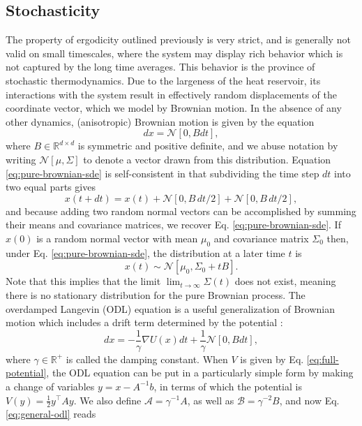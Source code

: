 \documentclass[prx,onecolumn,floatfix,longbibliography,notitlepage, nofootinbib,12pt]{revtex4-2}
\begin{document}
\begin{appendix}
\subsection{Stochasticity}
The property of ergodicity outlined previously is very strict, and is generally not valid on small timescales, where the system may display rich behavior which is not captured by the long time averages. This behavior is the province of stochastic thermodynamics. Due to the largeness of the heat reservoir, its interactions with the system result in effectively random displacements of the coordinate vector, which we model by Brownian motion. In the absence of any other dynamics, (anisotropic) Brownian motion is given by the equation \cite{doob1942brownian}
\begin{equation}
\label{eq:pure-brownian-sde}
    dx = \mathcal{N}[0, B dt],
\end{equation}
where $B\in \mathbb{R}^{d\times d}$ is symmetric and positive definite, and we abuse notation by writing $\mathcal{N}[\mu, \Sigma]$ to denote a vector drawn from this distribution. Equation \eqref{eq:pure-brownian-sde} is self-consistent in that subdividing the time step $dt$ into two equal parts gives
\begin{equation}
    x(t+dt) = x(t) + \mathcal{N}[0,B\,dt/2] +\mathcal{N}[0,
    B\,dt/2], 
\end{equation}
and because adding two random normal vectors can be accomplished by summing their means and covariance matrices, we recover Eq. \eqref{eq:pure-brownian-sde}. If $x(0)$ is a random normal vector with mean $\mu_0$ and covariance matrix $\Sigma_0$ then, under Eq. \eqref{eq:pure-brownian-sde}, the distribution at a later time $t$ is 
\begin{equation}
    x(t) \sim \mathcal{N}\left[\mu_0, \Sigma_0 + t B\right].
\end{equation}
Note that this implies that the limit $\lim_{t\to \infty} \Sigma(t)$ does not exist, meaning there is no stationary distribution for the pure Brownian process. The overdamped Langevin (ODL) equation is a useful generalization of Brownian motion which includes a drift term determined by the potential \cite{lemons1997paul, hatano2001steady}:
\begin{equation}
\label{eq:general-odl}
    dx = -\frac{1}{\gamma} \nabla U(x) dt +\frac{1}{\gamma}\mathcal{N}[0, B dt],
\end{equation}
where $\gamma \in \mathbb{R}^+$ is called the damping constant. When $V$ is given by Eq. \eqref{eq:full-potential}, the ODL equation can be put in a particularly simple form by making a change of variables $y = x - A^{-1} b$, in terms of which the potential is $V(y) = \frac{1}{2} y^\intercal A y$. We also define $\mathcal{A} = \gamma^{-1}A$, as well as $\mathcal{B} = \gamma^{-2}B$, and now Eq. \eqref{eq:general-odl} reads

\end{appendix}
\end{document}
